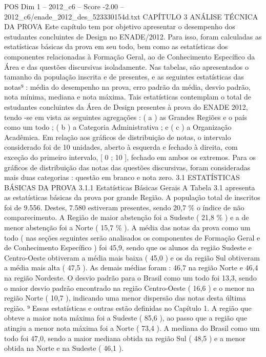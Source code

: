 \begin{textsample}{POS Dim 1 – 2012\_c6 – Score -2.00 – 2012\_c6/enade\_2012\_des\_523330154d.txt}  \label{ex:f1_pos_188}
CAPÍTULO 3 ANÁLISE TÉCNICA DA PROVA Este capítulo tem por objetivo apresentar o desempenho dos estudantes concluintes de Design no ENADE/2012.
Para isso, foram calculadas as estatísticas básicas da prova em seu todo, bem como as estatísticas dos componentes relacionadas à Formação Geral, ao de Conhecimento Específico da Área e das questões discursivas isoladamente.
Nas tabelas, são apresentados o tamanho da população inscrita e de presentes, e as seguintes estatísticas das notas⁹ : média do desempenho na prova, erro padrão da média, desvio padrão, nota mínima, mediana e nota máxima.
Tais estatísticas contemplam o total de estudantes concluintes da Área de Design presentes à prova do ENADE 2012, tendo -se em vista as seguintes agregações : ( a ) as Grandes Regiões e o país como um todo ; ( b ) a Categoria Administrativa ; e ( c ) a Organização Acadêmica.
Em relação aos gráficos de distribuição de notas, o intervalo considerado foi de 10 unidades, aberto à esquerda e fechado à direita, com exceção do primeiro intervalo, [ 0 ; 10 ], fechado em ambos os extremos.
Para os gráficos de distribuição das notas das questões discursivas, foram consideradas mais duas categorias : questão em branco e nota zero. 3.1 ESTATÍSTICAS BÁSICAS DA PROVA 3.1.1 Estatísticas Básicas Gerais A Tabela 3.1 apresenta as estatísticas básicas da prova por grande Região.
A população total de inscritos foi de 9.556.
Destes, 7.580 estiveram presentes, sendo 20,7 \% o índice de não comparecimento.
A Região de maior abstenção foi a Sudeste ( 21,8 \% ) e a de menor abstenção foi a Norte ( 15,7 \% ).
A média das notas da prova como um todo ( nas seções seguintes serão analisados os componentes de Formação Geral e de Conhecimento Específico ) foi 45,9, sendo que os alunos da região Sudeste e Centro-Oeste obtiveram a média mais baixa ( 45,0 ) e os da região Sul obtiveram a média mais alta ( 47,5 ).
As demais médias foram : 46,7 na região Norte e 46,4 na região Nordeste.
O desvio padrão para o Brasil como um todo foi 13,3, sendo o maior desvio padrão encontrado na região Centro-Oeste ( 16,6 ) e o menor na região Norte ( 10,7 ), indicando uma menor dispersão das notas desta última região. ⁹ Essas estatísticas e outras estão definidas no Capítulo 1.
A região que obteve a maior nota máxima foi a Sudeste ( 85,6 ), ao passo que a região que atingiu a menor nota máxima foi a Norte ( 73,4 ).
A mediana do Brasil como um todo foi 47,0, sendo a maior mediana obtida na região Sul ( 48,5 ) e a menor obtida na Norte e na Sudeste ( 46,1 ).

\end{textsample}
